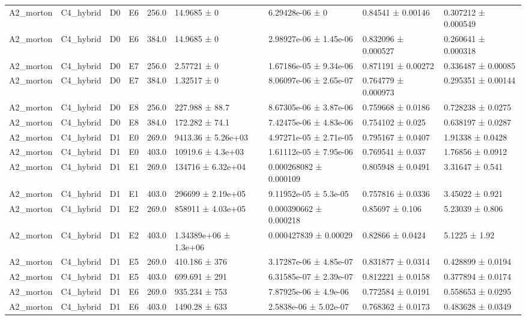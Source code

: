 \begin{table}
\begin{tabular}{lllllllll}
A2\_morton & C4\_hybrid & D0 & E6 & 256.0 & 14.9685 ± 0 & 6.29428e-06 ± 0 & 0.84541 ± 0.00146 & 0.307212 ± 0.000549 \\
A2\_morton & C4\_hybrid & D0 & E6 & 384.0 & 14.9685 ± 0 & 2.98927e-06 ± 1.45e-06 & 0.832096 ± 0.000527 & 0.260641 ± 0.000318 \\
A2\_morton & C4\_hybrid & D0 & E7 & 256.0 & 2.57721 ± 0 & 1.67186e-05 ± 9.34e-06 & 0.871191 ± 0.00272 & 0.336487 ± 0.00085 \\
A2\_morton & C4\_hybrid & D0 & E7 & 384.0 & 1.32517 ± 0 & 8.06097e-06 ± 2.65e-07 & 0.764779 ± 0.000973 & 0.295351 ± 0.00144 \\
A2\_morton & C4\_hybrid & D0 & E8 & 256.0 & 227.988 ± 88.7 & 8.67305e-06 ± 3.87e-06 & 0.759668 ± 0.0186 & 0.728238 ± 0.0275 \\
A2\_morton & C4\_hybrid & D0 & E8 & 384.0 & 172.282 ± 74.1 & 7.42475e-06 ± 4.83e-06 & 0.754102 ± 0.025 & 0.638197 ± 0.0287 \\
A2\_morton & C4\_hybrid & D1 & E0 & 269.0 & 9413.36 ± 5.26e+03 & 4.97271e-05 ± 2.71e-05 & 0.795167 ± 0.0407 & 1.91338 ± 0.0428 \\
A2\_morton & C4\_hybrid & D1 & E0 & 403.0 & 10919.6 ± 4.3e+03 & 1.61112e-05 ± 7.95e-06 & 0.769541 ± 0.037 & 1.76856 ± 0.0912 \\
A2\_morton & C4\_hybrid & D1 & E1 & 269.0 & 134716 ± 6.32e+04 & 0.000268082 ± 0.000109 & 0.805948 ± 0.0491 & 3.31647 ± 0.541 \\
A2\_morton & C4\_hybrid & D1 & E1 & 403.0 & 296699 ± 2.19e+05 & 9.11952e-05 ± 5.3e-05 & 0.757816 ± 0.0336 & 3.45022 ± 0.921 \\
A2\_morton & C4\_hybrid & D1 & E2 & 269.0 & 858911 ± 4.03e+05 & 0.000390662 ± 0.000218 & 0.85697 ± 0.106 & 5.23039 ± 0.806 \\
A2\_morton & C4\_hybrid & D1 & E2 & 403.0 & 1.34389e+06 ± 1.3e+06 & 0.000427839 ± 0.00029 & 0.82866 ± 0.0424 & 5.1225 ± 1.92 \\
A2\_morton & C4\_hybrid & D1 & E5 & 269.0 & 410.186 ± 376 & 3.17287e-06 ± 4.85e-07 & 0.831877 ± 0.0314 & 0.428899 ± 0.0194 \\
A2\_morton & C4\_hybrid & D1 & E5 & 403.0 & 699.691 ± 291 & 6.31585e-07 ± 2.39e-07 & 0.812221 ± 0.0158 & 0.377894 ± 0.0174 \\
A2\_morton & C4\_hybrid & D1 & E6 & 269.0 & 935.234 ± 753 & 7.87925e-06 ± 4.9e-06 & 0.772584 ± 0.0191 & 0.558653 ± 0.0295 \\
A2\_morton & C4\_hybrid & D1 & E6 & 403.0 & 1490.28 ± 633 & 2.5838e-06 ± 5.02e-07 & 0.768362 ± 0.0173 & 0.483628 ± 0.0349 \\

\end{tabular}
\end{table}
